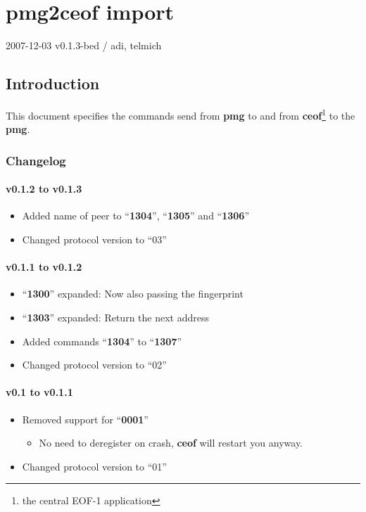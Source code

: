 \documentclass[12pt,a4paper]{book}
\begin{document}
\chapter{pmg2ceof import}

2007-12-03 v0.1.3-bed / adi, telmich

\section{Introduction}
This document specifies the commands send from \textbf{pmg} to and from
\textbf{ceof}\footnote{the central EOF-1 application} to the \textbf{pmg}.

\subsection{Changelog}
\subsubsection{v0.1.2 to v0.1.3}
\begin{itemize}
\item Added name of peer to "`\textbf{1304}"', "`\textbf{1305}"' and "`\textbf{1306}"'
\item Changed protocol version to "`03"'
\end{itemize}
\subsubsection{v0.1.1 to v0.1.2}
\begin{itemize}
\item "`\textbf{1300}"' expanded: Now also passing the fingerprint
\item "`\textbf{1303}"' expanded: Return the next address
\item Added commands "`\textbf{1304}"' to "`\textbf{1307}"'
\item Changed protocol version to "`02"'
\end{itemize}
\subsubsection{v0.1 to v0.1.1}
\begin{itemize}
\item Removed support for "`\textbf{0001}"'
\begin{itemize}
\item No need to deregister on crash, \textbf{ceof} will restart you anyway.
\end{itemize}
\item Changed protocol version to "`01"'
\end{itemize}
\end{document}
